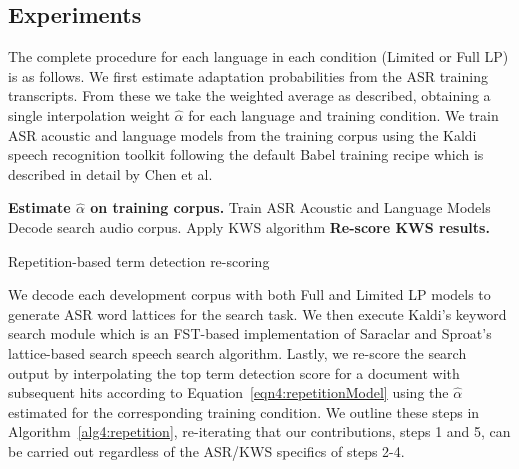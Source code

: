 \subsection{Experiments}
The complete procedure for each language in each condition (Limited or Full LP) is as follows.  We first estimate adaptation probabilities from the ASR training transcripts.  From these we take the weighted average as described, obtaining a single interpolation weight $\widehat{\alpha}$ for each language and training condition.   We train ASR acoustic and language models from the training corpus using the Kaldi speech recognition toolkit \cite{kaldi} following the default Babel training recipe which is described in detail by Chen et al.\cite{chen2013}

\begin{algorithm}
  \begin{algorithmic}[1]   
  \STATE \textbf{Estimate $\widehat{\alpha}$ on training corpus.}
  \STATE Train ASR Acoustic and Language Models
  \STATE Decode search audio corpus.
  \STATE Apply KWS algorithm
  \STATE \textbf{Re-score KWS results.}
  \end{algorithmic}
  \caption{Repetition-based term detection re-scoring}
  \label{alg4:repetition}
\end{algorithm}

We decode each development corpus with both Full and Limited LP models to generate ASR word lattices for the search task.  We then execute Kaldi's keyword search module which is an FST-based implementation of Saraclar and Sproat's lattice-based search speech search algorithm\cite{saraclar2004}.  Lastly, we re-score the search output by interpolating the top term detection score for a document with subsequent hits according to Equation~\ref{eqn4:repetitionModel} using the $\widehat{\alpha}$ estimated for the corresponding training condition.  We outline these steps in Algorithm~\ref{alg4:repetition}, re-iterating that our contributions, steps 1 and 5, can be carried out regardless of the ASR/KWS specifics of steps 2-4.


